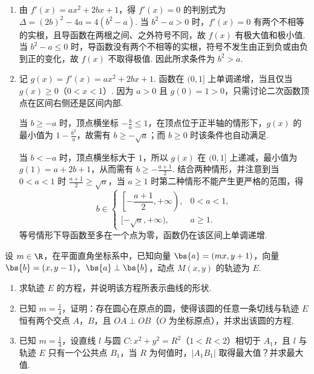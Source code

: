 \begin{solution}
\begin{enumerate}
\item 由 \(f'(x)=ax^2+2bx+1\)，得 \(f'(x)=0\) 的判别式为 \(\Delta=(2b)^2-4a=4(b^2-a)\). 当 \(b^2-a>0\) 时，\(f'(x)=0\) 有两个不相等的实根，且导函数在两根之间、之外符号不同，故 \(f(x)\) 有极大值和极小值. 当 \(b^2-a\leqslant0\) 时，导函数没有两个不相等的实根，符号不发生由正到负或由负到正的变化，故 \(f(x)\) 不取得极值. 因此所求条件为 \(b^2>a\).

\item 记 \(g(x)=f'(x)=ax^2+2bx+1\). 函数在 \((0,1]\) 上单调递增，当且仅当 \(g(x)\geqslant0\)（\(0<x<1\)）. 因为 \(a>0\) 且 \(g(0)=1>0\)，只需讨论二次函数顶点在区间右侧还是区间内部.

当 \(b\geqslant-a\) 时，顶点横坐标 \(-\frac{b}{a}\leqslant1\)，在顶点位于正半轴的情形下，\(g(x)\) 的最小值为 \(1-\frac{b^2}{a}\)，故需有 \(b\geqslant-\sqrt a\)；而 \(b\geqslant0\) 时该条件也自动满足.

当 \(b<-a\) 时，顶点横坐标大于 \(1\)，所以 \(g(x)\) 在 \((0,1]\) 上递减，最小值为 \(g(1)=a+2b+1\)，从而需有 \(b\geqslant-\frac{a+1}{2}\). 结合两种情形，并注意到当 \(0<a<1\) 时 \(\frac{a+1}{2}\geqslant\sqrt a\)，当 \(a\geqslant1\) 时第二种情形不能产生更严格的范围，得
\[
b\in
\begin{cases}
\left[-\dfrac{a+1}{2},+\infty\right),&0<a<1,\\
[-\sqrt a,+\infty),&a\geqslant1.
\end{cases}
\]
等号情形下导函数至多在一个点为零，函数仍在该区间上单调递增.
\end{enumerate}
\end{solution}

\begin{problem}
设 \(m \in \R\)，在平面直角坐标系中，已知向量 \(\bs{a} = (mx, y + 1)\)，向量 \(\bs{b} = (x, y - 1)\)，\(\bs{a} \perp \bs{b}\)，动点 \(M(x, y)\) 的轨迹为 \(E\).

\begin{enumerate}
\item 求轨迹 \(E\) 的方程，并说明该方程所表示曲线的形状.
\item 已知 \(m = \frac{1}{4}\)，证明：存在圆心在原点的圆，使得该圆的任意一条切线与轨迹 \(E\) 恒有两个交点 \(A\)，\(B\)，且 \(OA \perp OB\)（\(O\) 为坐标原点），并求出该圆的方程.
\item 已知 \(m = \frac{1}{4}\)，设直线 \(l\) 与圆 \(C: x^2 + y^2 = R^2\)（\(1 < R < 2\)）相切于 \(A_1\)，且 \(l\) 与轨迹 \(E\) 只有一个公共点 \(B_1\)，当 \(R\) 为何值时，\(\lvert A_1B_1\rvert\) 取得最大值？并求最大值.
\end{enumerate}
\end{problem}

